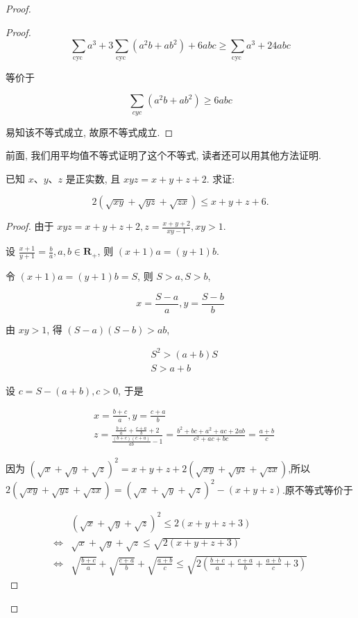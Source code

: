 \begin{proof}
\begin{example}
\begin{proof}
	$$
	\sum_{\text {cyc }} a^{3}+3 \sum_{\text {cyc }}\left(a^{2} b+a b^{2}\right)+6 a b c \geqslant \sum_{\text {cyc }} a^{3}+24 a b c
	$$
	
	等价于
	
	$$
	\sum_{c y c}\left(a^{2} b+a b^{2}\right) \geqslant 6 a b c
	$$
	
	易知该不等式成立, 故原不等式成立.
\end{proof}
\begin{note}
	前面, 我们用平均值不等式证明了这个不等式, 读者还可以用其他方法证明.
\end{note}

\begin{example}
	已知 $x 、 y 、 z$ 是正实数, 且 $x y z=x+y+z+2$. 求证:
	
	$$
	2(\sqrt{x y}+\sqrt{y z}+\sqrt{z x}) \leqslant x+y+z+6 .
	$$
\end{example}
\begin{proof}
	由于 $x y z=x+y+z+2, z=\frac{x+y+2}{x y-1}, x y>1$.
	
	设 $\frac{x+1}{y+1}=\frac{b}{a}, a, b \in \mathbf{R}_{+}$, 则 $(x+1) a=(y+1) b$.
	
	令 $(x+1) a=(y+1) b=S$, 则 $S>a, S>b$,
	
	$$
	x=\frac{S-a}{a}, y=\frac{S-b}{b}
	$$
	
	由 $x y>1$, 得 $(S-a)(S-b)>a b$,
	
	$$
	\begin{aligned}
	& S^{2}>(a+b) S \\
	& S>a+b
	\end{aligned}
	$$
	
	设 $c=S-(a+b), c>0$, 于是
	
	$$
	\begin{aligned}
	& x=\frac{b+c}{a}, y=\frac{c+a}{b} \\
	& z=\frac{\frac{b+c}{a}+\frac{c+a}{b}+2}{\frac{(b+c)(c+a)}{a b}-1}=\frac{b^{2}+b c+a^{2}+a c+2 a b}{c^{2}+a c+b c}=\frac{a+b}{c}
	\end{aligned}
	$$
	
	因为 $(\sqrt{x}+\sqrt{y}+\sqrt{z})^{2}=x+y+z+2(\sqrt{x y}+\sqrt{y z}+\sqrt{z x})$,所以 $2(\sqrt{x y}+\sqrt{y z}+\sqrt{z x})=(\sqrt{x}+\sqrt{y}+\sqrt{z})^{2}-(x+y+z)$.原不等式等价于
	
	$$
	\begin{aligned}
	& (\sqrt{x}+\sqrt{y}+\sqrt{z})^{2} \leqslant 2(x+y+z+3) \\
	\Leftrightarrow & \sqrt{x}+\sqrt{y}+\sqrt{z} \leqslant \sqrt{2(x+y+z+3)} \\
	\Leftrightarrow & \sqrt{\frac{b+c}{a}}+\sqrt{\frac{c+a}{b}}+\sqrt{\frac{a+b}{c}} \leqslant \sqrt{2\left(\frac{b+c}{a}+\frac{c+a}{b}+\frac{a+b}{c}+3\right)}
	\end{aligned}
	$$
	

\end{proof}
\end{example}
\end{proof}
